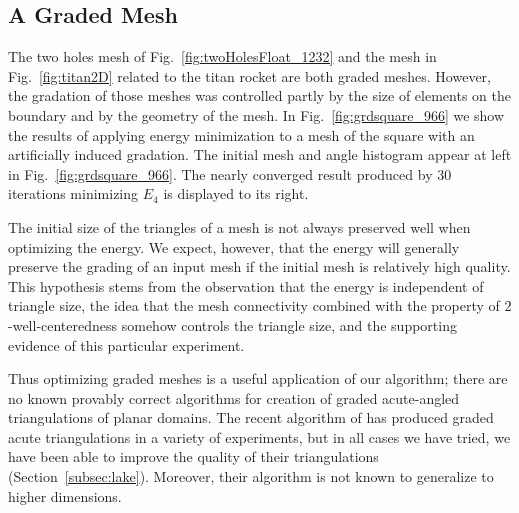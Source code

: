 \documentclass[final]{siamltex}
\begin{document}
\subsection{A Graded Mesh}
The two holes mesh of Fig.~\ref{fig:twoHolesFloat_1232} and the mesh
in Fig.~\ref{fig:titan2D} related to the titan rocket are both graded
meshes. However, the gradation of those meshes was controlled partly
by the size of elements on the boundary and by the geometry of the
mesh. In Fig.~\ref{fig:grdsquare_966} we show the results of applying
energy minimization to a mesh of the square with an artificially
induced gradation. The initial mesh and angle histogram appear at left
in Fig.~\ref{fig:grdsquare_966}.  The nearly converged result produced
by 30 iterations minimizing $E_4$ is displayed to its right. 

The initial size of the triangles of a mesh is not always preserved
well when optimizing the energy.  We expect, however, that
the energy will generally preserve the
grading of an input mesh if the initial mesh is
relatively high quality.  This hypothesis stems from the observation
that the energy is independent of triangle size, the idea that the
mesh connectivity combined with the property of $2$-well-centeredness
somehow controls the triangle size, and the supporting evidence of
this particular experiment. 

Thus optimizing graded meshes is a useful application of our
algorithm;  there are no known provably correct
algorithms for creation of graded acute-angled
triangulations of planar domains.  The recent algorithm of
\cite{ErUn2007} has produced graded acute triangulations in a
variety of experiments, but in all cases we have tried, we have
been able to improve the quality of
their triangulations (Section~\ref{subsec:lake}).  Moreover, their
algorithm is not known to generalize to higher dimensions.
\end{document}
